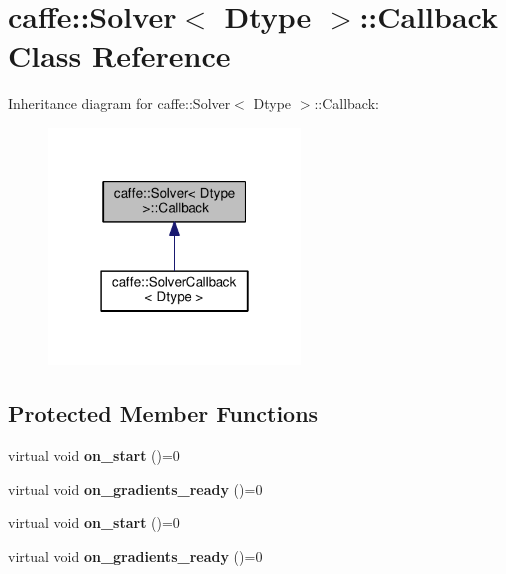 \hypertarget{classcaffe_1_1_solver_1_1_callback}{}\section{caffe\+:\+:Solver$<$ Dtype $>$\+:\+:Callback Class Reference}
\label{classcaffe_1_1_solver_1_1_callback}


Inheritance diagram for caffe\+:\+:Solver$<$ Dtype $>$\+:\+:Callback\+:
\nopagebreak
\begin{figure}[H]
\begin{center}
\leavevmode
\includegraphics[width=190pt]{classcaffe_1_1_solver_1_1_callback__inherit__graph}
\end{center}
\end{figure}
\subsection*{Protected Member Functions}
\begin{DoxyCompactItemize}
\item 
\mbox{\label{classcaffe_1_1_solver_1_1_callback_a4af79b534a8323a9fae9d5b0bceb8525}} 
virtual void {\bfseries on\+\_\+start} ()=0
\item 
\mbox{\label{classcaffe_1_1_solver_1_1_callback_a6c21ab833db14756dde845065752202b}} 
virtual void {\bfseries on\+\_\+gradients\+\_\+ready} ()=0
\item 
\mbox{\label{classcaffe_1_1_solver_1_1_callback_a4af79b534a8323a9fae9d5b0bceb8525}} 
virtual void {\bfseries on\+\_\+start} ()=0
\item 
\mbox{\label{classcaffe_1_1_solver_1_1_callback_a6c21ab833db14756dde845065752202b}} 
virtual void {\bfseries on\+\_\+gradients\+\_\+ready} ()=0
\end{DoxyCompactItemize}
